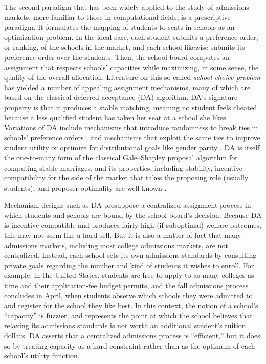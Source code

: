 \documentclass[12pt]{article}
\theoremstyle{definition}
\begin{document}
The second paradigm that has been widely applied to the study of admissions markets, more familiar to those in computational fields, is a prescriptive paradigm. It formulates the mapping of students to seats in schools as an optimization problem. In the ideal case, each student submits a preference order, or ranking, of the schools in the market, and each school likewise submits its preference order over the students. Then, the school board computes an assignment that respects schools' capacities while maximizing, in some sense, the quality of the overall allocation. Literature on this so-called \emph{school choice problem} has yielded a number of appealing assignment mechanisms, many of which are based on the classical deferred acceptance (DA) algorithm. DA's signature property is that it produces a stable matching, meaning no student feels cheated because a less qualified student has taken her seat at a school she likes. Variations of DA include mechanisms that introduce randomness to break ties in schools' preference orders \parencite[][]{whatmatters}, and mechanisms that exploit the same ties to improve student utility \parencite[][]{expandingchoice} or optimize for distributional goals like gender parity \parencite[][]{distributionalgoals}. DA is itself the one-to-many form of the classical Gale--Shapley proposal algorithm for computing stable marriages, and its properties, including stability, incentive compatibility for the side of the market that takes the proposing role (usually students), and proposer optimality are well known \parencite[][]{galeshapley1962, economicsofmatching}. 

Mechanism designs such as DA presuppose a centralized assignment process in which students and schools are bound by the school board's decision. Because DA is incentive compatible and produces fairly high (if suboptimal) welfare outcomes, this may not seem like a hard sell. But it is also a matter of fact that many admissions markets, including most college admissions markets, are not centralized. Instead, each school sets its own admissions standards by consulting private goals regarding the number and kind of students it wishes to enroll. For example, in the United States, students are free to apply to as many colleges as time and their application-fee budget permits, and the fall admissions process concludes in April, when students observe which schools they were admitted to and register for the school they like best. In this context, the notion of a school's ``capacity'' is fuzzier, and represents the point at which the school believes that relaxing its admissions standards is not worth an additional student's tuition dollars. DA asserts that a centralized admissions process is ``efficient,'' but it does so by treating capacity as a hard constraint rather than as the optimum of each school's utility function. 
\end{document}
